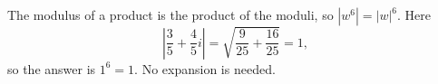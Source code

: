 The modulus of a product is the product of the moduli, so $|w^6|=|w|^6$. Here
\[
\left|\dfrac{3}{5}+\dfrac{4}{5}i\right|=\sqrt{\dfrac{9}{25}+\dfrac{16}{25}}=1,
\]
so the answer is $1^6=\boxed{1}$. No expansion is needed.
